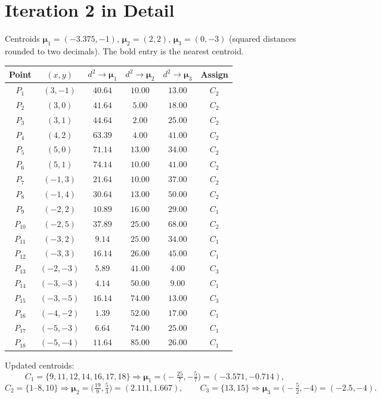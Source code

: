 \documentclass[11pt,a4paper]{report}
\theoremstyle{definition}
\theoremstyle{plain}
\theoremstyle{remark}
\newcommand{\vmu}{\bm{\mu}}
\begin{document}
	\section{Iteration 2 in Detail}
	Centroids $\vmu_1=(-3.375,-1)$, $\vmu_2=(2,2)$, $\vmu_3=(0,-3)$ (squared distances rounded to two decimals). The bold entry is the nearest centroid.
	\begin{center}
	\small
	\begin{tabular}{@{}ccccc c@{}}
	\toprule
	Point & $(x,y)$ & $d^2\!\to\vmu_1$ & $d^2\!\to\vmu_2$ & $d^2\!\to\vmu_3$ & Assign\\
	\midrule
	$P_{1}$ & $(3,-1)$ & $40.64$ & $\mathbf{10.00}$ & $13.00$ & $C_2$\\
	$P_{2}$ & $(3,0)$ & $41.64$ & $\mathbf{5.00}$ & $18.00$ & $C_2$\\
	$P_{3}$ & $(3,1)$ & $44.64$ & $\mathbf{2.00}$ & $25.00$ & $C_2$\\
	$P_{4}$ & $(4,2)$ & $63.39$ & $\mathbf{4.00}$ & $41.00$ & $C_2$\\
	$P_{5}$ & $(5,0)$ & $71.14$ & $\mathbf{13.00}$ & $34.00$ & $C_2$\\
	$P_{6}$ & $(5,1)$ & $74.14$ & $\mathbf{10.00}$ & $41.00$ & $C_2$\\
	$P_{7}$ & $(-1,3)$ & $21.64$ & $\mathbf{10.00}$ & $37.00$ & $C_2$\\
	$P_{8}$ & $(-1,4)$ & $30.64$ & $\mathbf{13.00}$ & $50.00$ & $C_2$\\
	$P_{9}$ & $(-2,2)$ & $\mathbf{10.89}$ & $16.00$ & $29.00$ & $C_1$\\
	$P_{10}$ & $(-2,5)$ & $37.89$ & $\mathbf{25.00}$ & $68.00$ & $C_2$\\
	$P_{11}$ & $(-3,2)$ & $\mathbf{9.14}$ & $25.00$ & $34.00$ & $C_1$\\
	$P_{12}$ & $(-3,3)$ & $\mathbf{16.14}$ & $26.00$ & $45.00$ & $C_1$\\
	$P_{13}$ & $(-2,-3)$ & $5.89$ & $41.00$ & $\mathbf{4.00}$ & $C_3$\\
	$P_{14}$ & $(-3,-3)$ & $\mathbf{4.14}$ & $50.00$ & $9.00$ & $C_1$\\
	$P_{15}$ & $(-3,-5)$ & $16.14$ & $74.00$ & $\mathbf{13.00}$ & $C_3$\\
	$P_{16}$ & $(-4,-2)$ & $\mathbf{1.39}$ & $52.00$ & $17.00$ & $C_1$\\
	$P_{17}$ & $(-5,-3)$ & $\mathbf{6.64}$ & $74.00$ & $25.00$ & $C_1$\\
	$P_{18}$ & $(-5,-4)$ & $\mathbf{11.64}$ & $85.00$ & $26.00$ & $C_1$\\
	\bottomrule
	\end{tabular}
	\end{center}
	Updated centroids:
	\[
C_1=\{9,11,12,14,16,17,18\}\Rightarrow\vmu_1=\bigl(-\tfrac{25}{7},-\tfrac{5}{7}\bigr)=(-3.571,-0.714),
\]
\[
C_2=\{1\text{--}8,10\}\Rightarrow\vmu_2=\bigl(\tfrac{19}{9},\tfrac{5}{3}\bigr)=(2.111,1.667),\qquad
C_3=\{13,15\}\Rightarrow\vmu_3=\bigl(-\tfrac{5}{2},-4\bigr)=(-2.5,-4).
\]
	
\end{document}

